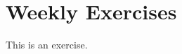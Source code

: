 \section{Weekly Exercises}

\solutionfalse

\begin{exercise}
    This is an exercise.
\end{exercise}
